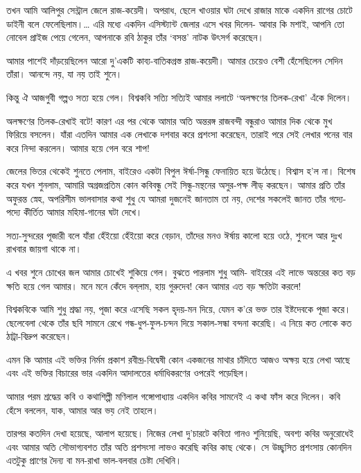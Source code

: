 \documentclass[a4paper,11pt]{article}
\begin{document}
\begin{multicols}{3}
{
\begin{spacing}{1.15}
\bn তখন আমি আলিপুর সেন্ট্রাল জেলে রাজ-কয়েদী। অপরাধ, ছেলে খাওয়ার ঘটা দেখে রাজার মাকে একদিন রাগের চোটে ডাইনী বলে ফেলেছিলাম।… এরি মধ্যে একদিন এসিস্ট্যান্ট জেলার এসে খবর দিলেন- আবার কি মশাই, আপনি তো নোবেল প্রাইজ পেয়ে গেলেন, আপনাকে রবি ঠাকুর তাঁর ‘বসন্ত’ নাটক উৎসর্গ করেছেন।

আমার পাশেই দাঁড়য়েছিলেন আরো দু’একটি কাব্য-বাতিকগ্রস্ত রাজ-কয়েদী। আমার চেয়েও বেশী হেঁসেছিলেন সেদিন তাঁরা। আনন্দে নয়, যা নয় তাই শুনে।

কিন্তু ঐ আজগুবী গল্পও সত্য হয়ে গেল। বিশ্বকবি সত্যি সত্যিই আমার ললাটে ‘অলক্ষণের তিলক-রেখা’ এঁকে দিলেন।

অলক্ষণের তিলক-রেখাই বটে! কারণ এর পর থেকে আমার অতি অন্তরঙ্গ রাজবন্দী বন্ধুরাও আমার দিক থেকে মুখ ফিরিয়ে বসলেন। যাঁরা এতদিন আমার এক লেখাকে দশবার করে প্রশংসা করেছেন, তারাই পরে সেই লেখার পনের বার করে নিন্দা করলেন। আমার হয়ে গেল বরে শাপ!

জেলের ভিতর থেকেই শুনতে পেলাম, বাইরেও একটা বিপুল ঈর্ষা-সিন্ধু ফেনায়িত হয়ে উঠেছে। বিশ্বাস হ’ল না। বিশেষ করে যখন শুনলাম, আমারি অগ্রজপ্রতিম কোন কবিবন্ধু সেই সিন্ধু-মন্থনের অসুর-পক্ষ লীড্‌ করছেন। আমার প্রতি তাঁর অফুরন্ত স্নেহ, অপরিসীম ভালবাসার কথা শুধু যে আমরা দুজনেই জানতাম তা নয়, দেশের সকলেই জানত তাঁর গদ্যে-পদ্যে কীর্তিত আমার মহিমা-গানের ঘটা দেখে।

সত্য-সুন্দরের পূজারী বলে যাঁরা হেঁইয়ো হেঁইয়ো করে বেড়ান, তাঁদের মনও ঈর্ষায় কালো হয়ে ওঠে, শুনলে আর দুঃখ রাখবার জায়গা থাকে না।

এ খবর শুনে চোখের জল আমার চোখেই শুকিয়ে গেল। বুঝতে পারলাম শুধু আমি- বাইরের এই লাভে অন্তরের কত বড় ক্ষতি হয়ে গেল আমার। মনে মনে কেঁদে বল্‌লাম, হায় গুরুদেব! কেন আমার এত বড় ক্ষতিটা করলে!

বিশ্বকবিকে আমি শুধু শ্রদ্ধা নয়, পূজা করে এসেছি সকল হৃদয়-মন দিয়ে, যেমন ক’রে ভক্ত তার ইষ্টদেবকে পূজা করে। ছেলেবেলা থেকে তাঁর ছবি সামনে রেখে গন্ধ-ধুপ-ফুল-চন্দন দিয়ে সকাল-সন্ধা বন্দনা করেছি। এ নিয়ে কত লোকে কত ঠাট্রা-বিদ্রুপ করেছেন।

এমন কি আমার এই ভক্তির নির্মম প্রকাশ রবীন্দ্র-বিদ্বেষী কোন একজনের মাথার চাঁদিতে আজও অক্ষয় হয়ে লেখা আছে এবং এই ভক্তির বিচারের ভার একদিন আদালতের ধর্মাধিকরণের ওপরেই পড়েছিল।

আমার পরম শ্রদ্ধেয় কবি ও কথাশিল্পী মণিলাল গঙ্গোপাধ্যায় একদিন কবির সামনেই এ কথা ফাঁস করে দিলেন। কবি হেঁসে বললেন, যাক, আমার আর ভয় নেই তাহলে।

তারপর কতদিন দেখা হয়েছে, আলাপ হয়েছে। নিজের লেখা দু’চারটে কবিতা গানও শুনিয়েছি, অবশ্য কবির অনুরোধেই এবং আমার অতি সৌভাগ্যবশত তাঁর অতি প্রশসংসা লাভও করেছি কবির কাছ থেকে। সে উচ্ছ্বসিত প্রশংসায় কোনদিন এতটুকু প্রাণের দৈন্য বা মন-রাখা ভাল-বলবার চেষ্টা দেখিনি।


\end{spacing}}
\end{multicols}
\end{document}
